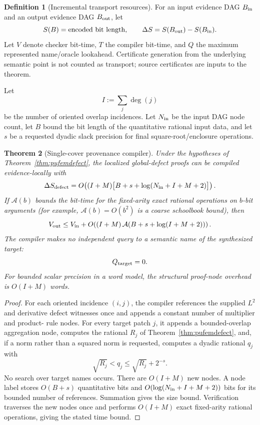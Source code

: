 \documentclass[11pt]{article}
\newtheorem{theorem}{Theorem}[section]
\theoremstyle{definition}
\newtheorem{definition}[theorem]{Definition}
\begin{document}
\begin{definition}[Incremental transport resources]\label{def:incremental}
For an input evidence DAG $B_{\rm in}$ and an output evidence DAG $B_{\rm out}$, let
\[
 S(B)=\text{encoded bit length},
 \qquad
 \Delta S=S(B_{\rm out})-S(B_{\rm in}).
\]
Let $V$ denote checker bit-time, $T$ the compiler bit-time, and $Q$ the maximum represented
name/oracle lookahead.  Certificate generation from the underlying semantic point is not
counted as transport; source certificates are inputs to the theorem.
\end{definition}

Let
\[
 I:=\sum_j\deg(j)
\]
be the number of oriented overlap incidences.  Let $N_{\rm in}$ be the input DAG node count,
let $B$ bound the bit length of the quantitative rational input data, and let $s$ be a
requested dyadic slack precision for final square-root/enclosure operations.

\begin{theorem}[Single-cover provenance compiler]\label{thm:singlecovercost}
Under the hypotheses of Theorem~\ref{thm:pufemdefect}, the localized global-defect proofs
can be compiled evidence-locally with
\[
 \Delta S_{\rm defect}
 =O\!\left((I+M)\bigl[B+s+\log(N_{\rm in}+I+M+2)\bigr]\right).
\]
If $\mathcal A(b)$ bounds the bit-time for the fixed-arity exact rational operations on
$b$-bit arguments (for example, $\mathcal A(b)=O(b^2)$ is a coarse schoolbook bound), then
\[
 V_{\rm out}
 \le V_{\rm in}
 +O\!\left((I+M)\,\mathcal A(B+s+\log(I+M+2))\right).
\]
The compiler makes no independent query to a semantic name of the synthesized target:
\[
 Q_{\rm target}=0.
\]
For bounded scalar precision in a word model, the structural proof-node overhead is
$O(I+M)$ words.
\end{theorem}

\begin{proof}
For each oriented incidence $(i,j)$, the compiler references the supplied $L^2$ and
derivative defect witnesses once and appends a constant number of multiplier and product-
rule nodes.  For every target patch $j$, it appends a bounded-overlap aggregation node,
computes the rational $R_j$ of Theorem~\ref{thm:pufemdefect}, and, if a norm rather than a
squared norm is requested, computes a dyadic rational $q_j$ with
\[
 \sqrt{R_j}<q_j\le\sqrt{R_j}+2^{-s}.
\]
No search over target names occurs.  There are $O(I+M)$ new nodes.  A node label stores
$O(B+s)$ quantitative bits and $O(\log(N_{\rm in}+I+M+2))$ bits for its bounded number of
references.  Summation gives the size bound.  Verification traverses the new nodes once and performs $O(I+M)$ exact fixed-arity
rational operations, giving the stated time bound.
\end{proof}
\end{document}
